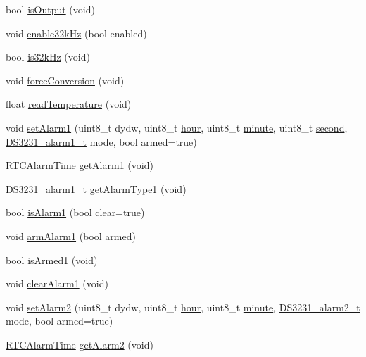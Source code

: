 \begin{DoxyCompactItemize}
\item 
bool \hyperlink{class_d_s3231_a33a730f793ad488fe55362525da2c548}{is\+Output} (void)
\item 
void \hyperlink{class_d_s3231_a615d932043f11f513468d4ab97833fd3}{enable32k\+Hz} (bool enabled)
\item 
bool \hyperlink{class_d_s3231_a5cb71b75ea98cbb7493610d5552bc771}{is32k\+Hz} (void)
\item 
void \hyperlink{class_d_s3231_ad398fd513aae24b219d19574e20da550}{force\+Conversion} (void)
\item 
float \hyperlink{class_d_s3231_a82074e0d3f0a4a646fc14f1afcb80448}{read\+Temperature} (void)
\item 
void \hyperlink{class_d_s3231_a23cea53349c55fba93c706b6e263e574}{set\+Alarm1} (uint8\+\_\+t dydw, uint8\+\_\+t \hyperlink{_time_8cpp_ac4706d0cffc9e111a6c6a757b462e88e}{hour}, uint8\+\_\+t \hyperlink{_time_8cpp_a88285e3771bcb970424122a6ee4b40fa}{minute}, uint8\+\_\+t \hyperlink{_time_8cpp_a10a4dd811353baa12dadadee7c7e5099}{second}, \hyperlink{_d_s3231_8h_a021549876ea6cc2f35d62387624b95c6}{D\+S3231\+\_\+alarm1\+\_\+t} mode, bool armed=true)
\item 
\hyperlink{_d_s3231_8h_struct_r_t_c_alarm_time}{R\+T\+C\+Alarm\+Time} \hyperlink{class_d_s3231_a7241d497e56fc0062ad68a9bc31e212a}{get\+Alarm1} (void)
\item 
\hyperlink{_d_s3231_8h_a021549876ea6cc2f35d62387624b95c6}{D\+S3231\+\_\+alarm1\+\_\+t} \hyperlink{class_d_s3231_a20d9f5ec608a5b0a5010ad1a91cf667b}{get\+Alarm\+Type1} (void)
\item 
bool \hyperlink{class_d_s3231_a9e07f99282167c3e799bef2d2d163e17}{is\+Alarm1} (bool clear=true)
\item 
void \hyperlink{class_d_s3231_ad8333b85e1bcbf40e471e67ed63cc4bc}{arm\+Alarm1} (bool armed)
\item 
bool \hyperlink{class_d_s3231_a5654d336dd345f7db3a4867cfe1b6f20}{is\+Armed1} (void)
\item 
void \hyperlink{class_d_s3231_aad73bcd32141177f36dbf0dc10feb2fd}{clear\+Alarm1} (void)
\item 
void \hyperlink{class_d_s3231_ad505857c3594da9a4c159f607845364e}{set\+Alarm2} (uint8\+\_\+t dydw, uint8\+\_\+t \hyperlink{_time_8cpp_ac4706d0cffc9e111a6c6a757b462e88e}{hour}, uint8\+\_\+t \hyperlink{_time_8cpp_a88285e3771bcb970424122a6ee4b40fa}{minute}, \hyperlink{_d_s3231_8h_aa0537c63605a088db9e55f744f1da4b0}{D\+S3231\+\_\+alarm2\+\_\+t} mode, bool armed=true)
\item 
\hyperlink{_d_s3231_8h_struct_r_t_c_alarm_time}{R\+T\+C\+Alarm\+Time} \hyperlink{class_d_s3231_a6917f3adf3b16a5d1afb67179461ba95}{get\+Alarm2} (void)

\end{DoxyCompactItemize}
